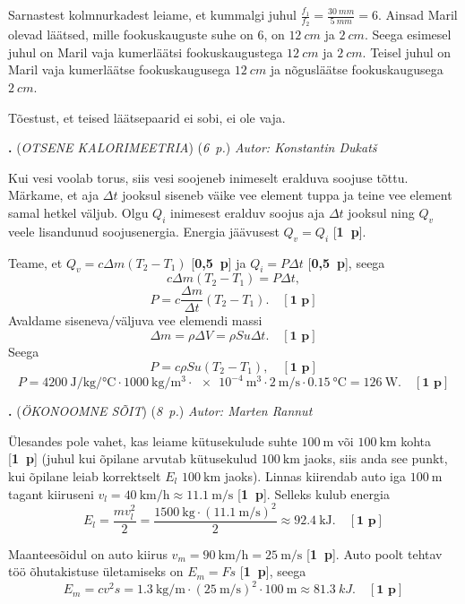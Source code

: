 \documentclass[11pt,a5paper]{article}
\newcommand{\numb}[1]{\vspace{5pt}\textbf{\large #1}}
\newcommand{\nimi}[1]{(\textsl{\small #1})}
\newcommand{\punktid}[1]{(\emph{#1~p.})}
\newcommand{\p}[1]{[\textbf{#1~p}]}
\newcounter{ylesanne}
\newcommand{\yl}[1]{\addtocounter{ylesanne}{1}\numb{\theylesanne.} \nimi{#1} \newblock{}}
\newcommand{\autor}[1]{\emph{Autor: #1}}%
\begin{document}
Sarnastest kolmnurkadest leiame, et kummalgi juhul $\frac{f_1}{f_2} = \frac{\SI{30}{mm}}{\SI{5}{mm}} = 6$. Ainsad Maril olevad läätsed, mille fookuskauguste suhe on $6$, on $\SI{12}{cm}$ ja $\SI{2}{cm}$. Seega esimesel juhul on Maril vaja kumerläätsi fookuskaugustega $\SI{12}{cm}$ ja $\SI{2}{cm}$. Teisel juhul on Maril vaja kumerläätse fookuskaugusega $\SI{12}{cm}$ ja nõgusläätse fookuskaugusega $\SI{2}{cm}$.

Tõestust, et teised läätsepaarid ei sobi, ei ole vaja.

\yl{OTSENE KALORIMEETRIA}
\punktid{6} \autor{Konstantin Dukatš}

Kui vesi voolab torus, siis vesi soojeneb inimeselt eralduva soojuse tõttu. Märkame, et aja $\Delta t$ jooksul siseneb väike vee element tuppa ja teine vee element samal hetkel väljub. Olgu $Q_i$ inimesest eralduv soojus aja $\Delta t$ jooksul ning $Q_v$ veele lisandunud soojusenergia. Energia jäävusest $Q_v = Q_i$ \p{1}.

Teame, et $Q_v = c\Delta m (T_2-T_1)$ \p{0,5} ja $Q_i = P\Delta t$ \p{0,5}, seega
$$c \Delta m (T_2 - T_1) = P\Delta t,$$
$$P = c \frac{\Delta m}{\Delta t} (T_2 - T_1).\quad\p{1}$$
Avaldame siseneva/väljuva vee elemendi massi
$$\Delta m = \rho \Delta V = \rho S u \Delta t. \quad\p{1}$$
Seega
$$P = c\rho S u (T_2-T_1),\quad\p{1}$$
$$P = \SI{4200}{\J\per\kg\per\celsius}\cdot \SI{1000}{\kg\per\m\cubed}\cdot \SI{e-4}{\m\cubed}\cdot \SI{2}{\m\per\s}\cdot\SI{0.15}{\celsius} = \SI{126}{\W} .\quad\p{1}$$


\yl{ÖKONOOMNE SÕIT}
\punktid{8} \autor{Marten Rannut}

Ülesandes pole vahet, kas leiame kütusekulude suhte $\SI{100}{\m}$ või $\SI{100}{\km}$ kohta \p{1} (juhul kui õpilane arvutab kütusekulud $\SI{100}{\km}$ jaoks, siis anda see punkt, kui õpilane leiab korrektselt $E_l$ $\SI{100}{\km}$ jaoks). Linnas kiirendab auto iga $\SI{100}{\m}$ tagant kiiruseni $v_l = \SI{40}{\km\per\hour} \approx \SI{11.1}{\m\per\s}$ \p{1}. Selleks kulub energia
\begin{equation*}
    E_l = \frac{mv_l^2}{2} = \frac{\SI{1500}{\kg}\cdot (\SI{11.1}{\m\per\s})^2}{2} \approx \SI{92.4}{\kJ}. \quad \p{1}
\end{equation*}

Maanteesõidul on auto kiirus $v_m = \SI{90}{\km\per\hour} = \SI{25}{\m\per\s}$ \p{1}. Auto poolt tehtav töö õhutakistuse ületamiseks on $E_m = Fs$ \p{1}, seega
\begin{equation*}
    E_m = cv^2s = \SI{1.3}{\kg\per\m}\cdot \left(\SI{25}{\m\per\s}\right)^2 \cdot \SI{100}{\m} \approx \SI{81.3}{kJ}.\quad \p{1}
\end{equation*}
\end{document}
